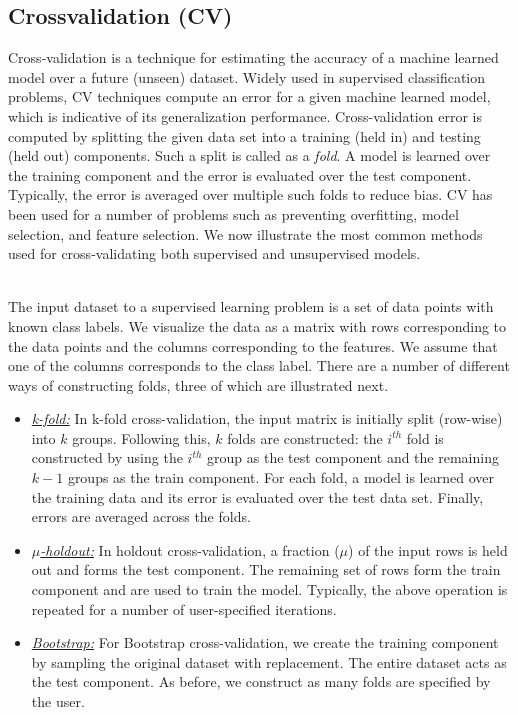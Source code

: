 \documentclass{vldb}
\newcommand{\topic}[1]{\par \smallskip \smallskip \noindent{\bf \uline{#1}}}
\begin{document}
\subsection{Crossvalidation (CV)}
\label{sec:cvbackground}
Cross-validation is a technique for estimating the accuracy of a machine learned
model over a future (unseen) dataset. Widely used in supervised classification
problems, CV techniques compute an error for a given machine learned model,
which is indicative of its generalization performance. Cross-validation error is
computed by splitting the
given data set into a training (held in) and testing (held out) components. Such
a split is called as a {\em fold}. A model is learned over the training
component and the error is evaluated over the test
component. Typically, the error is averaged over multiple such folds to reduce bias. 
CV has been used for a number of problems such as preventing overfitting, model
selection, and feature selection. We now illustrate the most common methods used
for cross-validating both supervised and unsupervised models.

\topic{Supervised learning:}\\
The input dataset to a supervised learning problem is a set of data points
with known class labels. We visualize the data as a matrix with rows
corresponding to the data points and the columns corresponding to the
features. We assume that one of the columns corresponds to the class label.
There are a number of different ways of constructing folds, three of which are
illustrated next.

\begin{itemize}
\item \underline{\em k-fold:} In k-fold cross-validation, the input matrix is initially
split (row-wise) into $k$ groups. Following this, $k$ folds are constructed:
the $i^{th}$ fold is constructed by using the $i^{th}$ group as the
test component and the remaining $k-1$ groups as the train component. For each
fold, a model is learned over the training data and its error is evaluated over
the test data set. Finally, errors are averaged across the folds.
\item \underline{\em $\mu$-holdout:} In holdout cross-validation, a fraction ($\mu$) of the
input rows is held out and forms the test component. The remaining set of rows
form the train component and are used to train the model. Typically, the above
operation is repeated for a number of user-specified iterations. 
\item \underline{\em Bootstrap:} For Bootstrap cross-validation, we create the training
component by sampling the original dataset with replacement. The entire dataset
acts as the test component. As before, we construct as many folds are specified
by the user.
\end{itemize}
\end{document}
